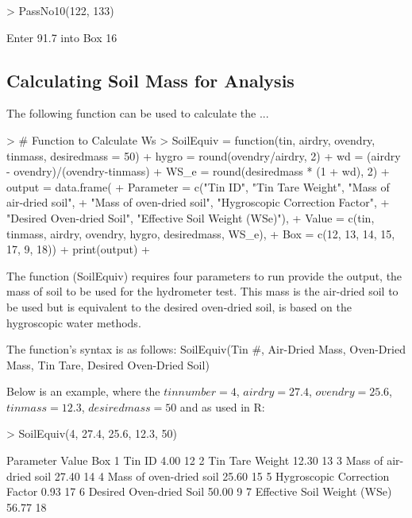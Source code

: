 \begin{Schunk}
\begin{Sinput}
> PassNo10(122, 133)
\end{Sinput}
\begin{Soutput}
Enter 91.7 into Box 16
\end{Soutput}
\end{Schunk}

\subsection{Calculating Soil Mass for Analysis}

The following function can be used to calculate the ...

\begin{Schunk}
\begin{Sinput}
> # Function to Calculate Ws 
> SoilEquiv = function(tin, airdry, ovendry, tinmass, desiredmass = 50){
+ hygro = round(ovendry/airdry, 2)
+ wd = (airdry - ovendry)/(ovendry-tinmass)
+ WS_e = round(desiredmass * (1 + wd), 2)
+ output = data.frame(
+   Parameter = c("Tin ID", "Tin Tare Weight", "Mass of air-dried soil", 
+       "Mass of oven-dried soil", "Hygroscopic Correction Factor", 
+       "Desired Oven-dried Soil", "Effective Soil Weight (WSe)"),
+   Value = c(tin, tinmass, airdry, ovendry, hygro, desiredmass, WS_e),
+   Box = c(12, 13, 14, 15, 17, 9, 18))
+ print(output)
+ }
\end{Sinput}
\end{Schunk}

The function (SoilEquiv) requires four parameters to run provide the output, the mass of soil to be used for the hydrometer test. This mass is the air-dried soil to be used but is equivalent to the desired oven-dried soil, is based on the hygroscopic water methods. 

The function's syntax is as follows: SoilEquiv(Tin \#, Air-Dried Mass, Oven-Dried Mass, Tin Tare, Desired Oven-Dried Soil)

Below is an example, where the $tin number = 4$, $airdry = 27.4$, $ovendry = 25.6$, $tinmass = 12.3$, $desiredmass = 50$ and as used in R: 

\begin{Schunk}
\begin{Sinput}
> SoilEquiv(4, 27.4, 25.6, 12.3, 50)
\end{Sinput}
\begin{Soutput}
                      Parameter Value Box
1                        Tin ID  4.00  12
2               Tin Tare Weight 12.30  13
3        Mass of air-dried soil 27.40  14
4       Mass of oven-dried soil 25.60  15
5 Hygroscopic Correction Factor  0.93  17
6       Desired Oven-dried Soil 50.00   9
7   Effective Soil Weight (WSe) 56.77  18
\end{Soutput}
\end{Schunk}


